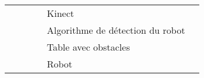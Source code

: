 \begin{landscape}
\begin{table}[htbp]
{\begin{tabular}{|Z{\centering}{m}{4cm}||Z{\centering}{m}{5cm}|Z{\centering}{m}{5cm}|Z{\centering}{m}{3cm}|Z{\centering}{m}{4cm}|Z{\centering}{m}{5cm}|}
                                                      &                                                         &                                                                                                                               &                                                 & Kinect                                            & \\  
                                                      &                                                         &                                                                                                                               &                                                 & Algorithme de détection du robot                  & \\ 
                                                      &                                                         &                                                                                                                               &                                                 & Table avec obstacles                              & \\ 
                                                      &                                                         &                                                                                                                               &                                                 & Robot                                             & \\ 
   \end{tabular}}%
  \label{tab:pt2}%
\end{table}%
\end{landscape}

